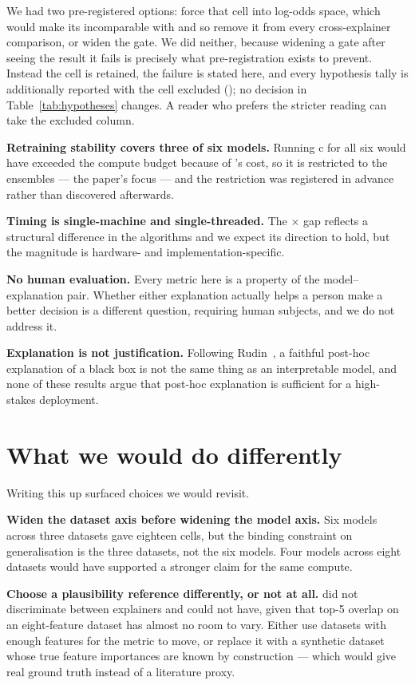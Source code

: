 We had two pre-registered options: force that cell into log-odds space, which would make
its \shap{} incomparable with \lime{} and so remove it from every cross-explainer
comparison, or widen the gate. We did neither, because widening a gate after seeing the
result it fails is precisely what pre-registration exists to prevent. Instead the cell is
retained, the failure is stated here, and every hypothesis tally is additionally reported
with the cell excluded (); no decision in
Table~\ref{tab:hypotheses} changes. A reader who prefers the stricter reading can take
the excluded column.

\textbf{Retraining stability covers three of six models.} Running c for all six
would have exceeded the compute budget because of \lime{}'s cost, so it is restricted
to the ensembles --- the paper's focus --- and the restriction was registered in
advance rather than discovered afterwards.

\textbf{Timing is single-machine and single-threaded.} The \SpeedFactor{}$\times$ gap
reflects a structural difference in the algorithms and we expect its direction to
hold, but the magnitude is hardware- and implementation-specific.

\textbf{No human evaluation.} Every metric here is a property of the model--explanation
pair. Whether either explanation actually helps a person make a better decision is a
different question, requiring human subjects, and we do not address it.

\textbf{Explanation is not justification.} Following
Rudin~\cite{rudin2019stop}, a faithful post-hoc explanation of a black box is not the
same thing as an interpretable model, and none of these results argue that
post-hoc explanation is sufficient for a high-stakes deployment.

\section{What we would do differently}
Writing this up surfaced choices we would revisit.

\textbf{Widen the dataset axis before widening the model axis.} Six models across three
datasets gave eighteen cells, but the binding constraint on generalisation is the three
datasets, not the six models. Four models across eight datasets would have supported a
stronger claim for the same compute.

\textbf{Choose a plausibility reference differently, or not at all.}  did not
discriminate between explainers and could not have, given that top-5 overlap on an
eight-feature dataset has almost no room to vary. Either use datasets with enough
features for the metric to move, or replace it with a synthetic dataset whose true
feature importances are known by construction --- which would give real ground truth
instead of a literature proxy.

